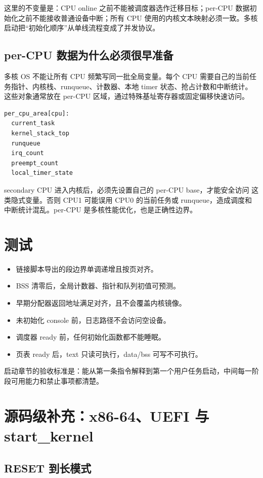 这里的不变量是：CPU online 之前不能被调度器选作迁移目标；per-CPU 数据初始化之前不能接收普通设备中断；所有 CPU 使用的内核文本映射必须一致。多核启动把“初始化顺序”从单线流程变成了并发协议。

\subsection{per-CPU 数据为什么必须很早准备}

多核 OS 不能让所有 CPU 频繁写同一批全局变量。每个 CPU 需要自己的当前任务指针、内核栈、runqueue、计数器、本地 timer 状态、抢占计数和中断统计。这些对象通常放在 per-CPU 区域，通过特殊基址寄存器或固定偏移快速访问。

\begin{lstlisting}
per_cpu_area[cpu]:
  current_task
  kernel_stack_top
  runqueue
  irq_count
  preempt_count
  local_timer_state
\end{lstlisting}

secondary CPU 进入内核后，必须先设置自己的 per-CPU base，才能安全访问  这类隐式变量。否则 CPU1 可能误用 CPU0 的当前任务或 runqueue，造成调度和中断统计混乱。per-CPU 是多核性能优化，也是正确性边界。

\section{测试}

\begin{itemize}
\tightlist
\item 链接脚本导出的段边界单调递增且按页对齐。
\item BSS 清零后，全局计数器、指针和队列初值可预测。
\item 早期分配器返回地址满足对齐，且不会覆盖内核镜像。
\item 未初始化 console 前，日志路径不会访问空设备。
\item 调度器 ready 前，任何初始化函数都不能睡眠。
\item 页表 ready 后，text 只读可执行，data/bss 可写不可执行。
\end{itemize}

启动章节的验收标准是：能从第一条指令解释到第一个用户任务启动，中间每一阶段可用能力和禁止事项都清楚。

\section{源码级补充：x86-64、UEFI 与 start\_kernel}

\subsection{RESET 到长模式}

